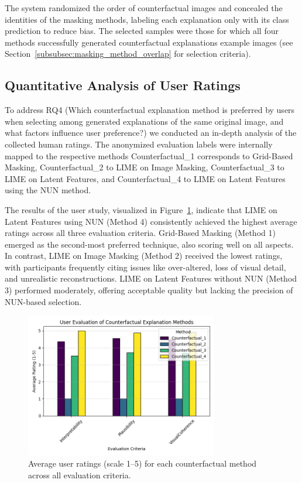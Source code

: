 The system randomized the order of counterfactual images and concealed the identities of the masking methods, labeling each explanation only with its class prediction to reduce bias. The selected samples were those for which all four methods successfully generated counterfactual explanations example images (see Section~\ref{subsubsec:masking_method_overlap} for selection criteria).



\subsection{Quantitative Analysis of User Ratings} \label{subsubsec:quantitative_analysis_of_user_ratings}
To address RQ4 (Which counterfactual explanation method is preferred by users when selecting among generated explanations of the same original image, and what factors influence user preference?) we conducted an in-depth analysis of the collected human ratings. The anonymized evaluation labels were internally mapped to the respective methods Counterfactual\_1 corresponds to Grid-Based Masking, Counterfactual\_2 to LIME on Image Masking, Counterfactual\_3 to LIME on Latent Features, and Counterfactual\_4 to LIME on Latent Features using the NUN method.


The results of the user study, visualized in Figure~\ref{fig:bar_plot_user_eval}, indicate that LIME on Latent Features using NUN (Method 4) consistently achieved the highest average ratings across all three evaluation criteria. Grid-Based Masking (Method 1) emerged as the second-most preferred technique, also scoring well on all aspects. In contrast, LIME on Image Masking (Method 2) received the lowest ratings, with participants frequently citing issues like over-altered, loss of visual detail, and unrealistic reconstructions. LIME on Latent Features without NUN (Method 3) performed moderately, offering acceptable quality but lacking the precision of NUN-based selection.

\begin{figure}[htbp]
    \centering
    \includegraphics[width=0.75\textwidth]{img/human_rating_results/bar_plot_user_evaluations.png}
    \caption{Average user ratings (scale 1–5) for each counterfactual method across all evaluation criteria.}
    \label{fig:bar_plot_user_eval}
\end{figure}

